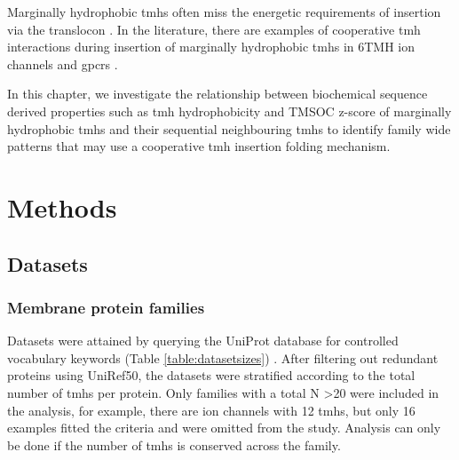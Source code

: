 Marginally hydrophobic \gls{tmh}s often miss the energetic requirements of insertion via the translocon \cite{Hessa2007}.
In the literature, there are examples of cooperative \gls{tmh} interactions during insertion of marginally hydrophobic \gls{tmh}s in 6TMH ion channels and \gls{gpcr}s \cite{Ismail2008, Virkki2014, Sadlish2005, Cross2009, Cymer2013, Sato2002, Sato2003, Zhang2007, Cymer2015, Tu2000, Tu2014, Ojemalm2012}.

In this chapter, we investigate the relationship between biochemical sequence derived properties such as \gls{tmh} hydrophobicity and TMSOC z\--score \cite{Wong2011, Wong2012} of marginally hydrophobic \gls{tmh}s and their sequential neighbouring \gls{tmh}s to identify family wide patterns that may use a cooperative \gls{tmh} insertion folding mechanism.

\section{Methods}
\subsection{Datasets}
\subsubsection{Membrane protein families}

Datasets were attained by querying the UniProt database for controlled vocabulary keywords (Table \ref{table:datasetsizes}) \cite{TheUniProtConsortium2014}.
After filtering out redundant proteins using UniRef50, the datasets were stratified according to the total number of \gls{tmh}s per protein.
Only families with a total N \textgreater 20 were included in the analysis, for example, there are ion channels with 12 \gls{tmh}s, but only 16 examples fitted the criteria and were omitted from the study.
Analysis can only be done if the number of \gls{tmh}s is conserved across the family.



